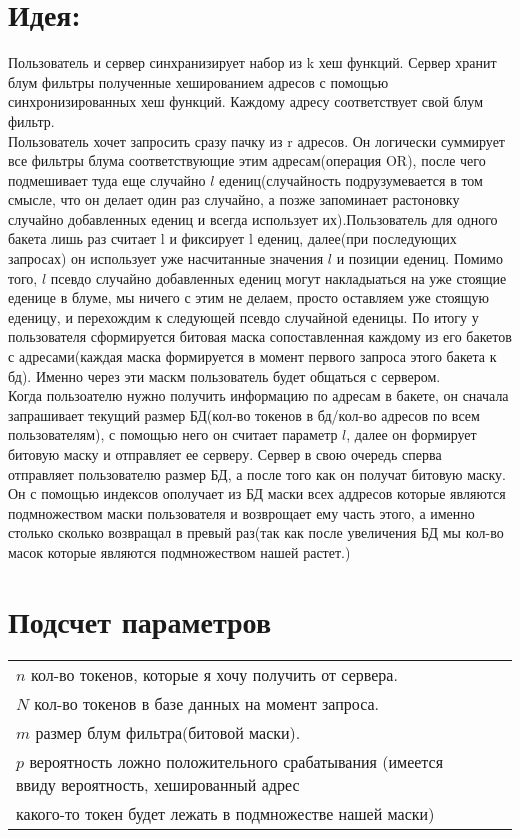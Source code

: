 \documentclass{revtex4}
\begin{document}
\section*{Идея:}
Пользователь и сервер синхранизирует набор из k хеш функций. Сервер хранит блум фильтры полученные хешированием адресов с помощью синхронизированных хеш функций. Каждому адресу соответствует свой блум фильтр. \\ 
Пользователь хочет запросить сразу пачку из r адресов. Он логически суммирует все фильтры блума соответствующие этим адресам(операция OR), после чего подмешивает туда еще случайно $l$ едениц(случайность подрузумевается в том
 смысле, что он делает один раз случайно, а позже запоминает растоновку случайно добавленных едениц и всегда использует их).Пользователь для одного бакета лишь раз считает l и фиксирует l едениц, далее(при последующих запросах)
  он использует уже насчитанные значения $l$  и позиции едениц. Помимо того, $l$ псевдо случайно добавленных едениц могут накладыаться на уже стоящие еденице в блуме, 
   мы ничего с этим не делаем, просто оставляем уже стоящую еденицу, и перехождим к следующей псевдо случайной еденицы. По итогу у пользователя сформируется битовая маска сопоставленная каждому из его бакетов с адресами(каждая маска формируется в момент первого запроса этого бакета к бд). 
   Именно через эти маскм пользователь будет общаться с сервером. \\
    Когда пользоателю нужно получить информацию по адресам в бакете, он сначала запрашивает текущий размер БД(кол-во токенов в бд/кол-во адресов по всем пользователям), с помощью него он считает параметр $l$, далее он формирует битовую маску и отправляет ее серверу. Сервер в свою очередь
    сперва отправляет пользователю размер БД, а после того как он получат битовую маску. Он с помощью индексов ополучает из БД маски всех аддресов которые являются подмножеством маски пользователя и возврощает ему часть этого, а именно столько сколько возвращал в превый раз(так как после увеличения БД
    мы кол-во масок которые являются подмножеством нашей растет.)


\section*{Подсчет параметров}
\begin{tabular}{|l|l|}
    \hline
    $n$ \- кол-во токенов, которые я хочу получить от сервера. \\
    $N$ \- кол-во токенов в базе данных на момент запроса. \\
    $m$ \- размер блум фильтра(битовой маски). \\
    $p$ \- вероятность ложно положительного срабатывания (имеется ввиду вероятность, хешированный адрес \\ какого-то токен будет лежать в подмножестве нашей маски)\\ 
    \hline
\end{tabular} \\
\end{document}
